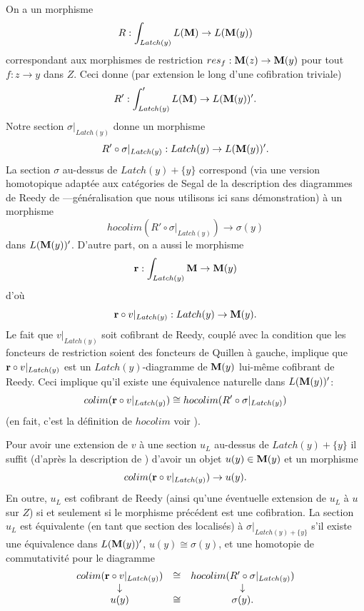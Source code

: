 \documentclass[12pt]{article}
\newcommand{\mm}{{\bf M}}
\begin{document}
On a un morphisme
$$
R: \int _{Latch(y)}L(\mm )\rightarrow L(\mm (y))
$$
correspondant aux
morphismes de restriction $res_f: \mm (z)\rightarrow \mm (y)$
pour tout $f:z\rightarrow y$ dans $Z$. Ceci donne
(par extension le long d'une cofibration triviale)
$$
R': \int '_{Latch(y)}L(\mm )\rightarrow L(\mm (y))' .
$$
Notre section $\sigma |_{Latch (y)}$ donne un morphisme
$$
R'\circ \sigma |_{Latch(y)} : Latch (y) \rightarrow L(\mm (y))'.
$$
La section $\sigma$ au-dessus de $Latch(y)+ \{ y\}$ correspond
(via une version homotopique
adapt\'ee aux cat\'egories de Segal de la description des
diagrammes de Reedy de \cite{Hirschhorn} \cite{DHK}---g\'en\'eralisation que
nous utilisons ici sans d\'emonstration) \`a un morphisme
$$
hocolim (R'\circ \sigma |_{Latch(y)})\rightarrow \sigma (y)
$$
dans $L(\mm (y))'$. D'autre part, on a aussi le morphisme
$$
{\bf r}: \int _{Latch(y)}\mm \rightarrow \mm (y)
$$
d'o\`u
$$
{\bf r}\circ v|_{Latch (y)}: Latch(y)\rightarrow \mm (y).
$$
Le fait que $v|_{Latch(y)}$ soit cofibrant de Reedy, coupl\'e avec la condition
que les foncteurs de restriction soient des foncteurs de Quillen \`a gauche,
implique que ${\bf r}\circ v|_{Latch (y)}$ est un $Latch(y)$-diagramme de
$\mm (y)$ lui-m\^eme cofibrant de Reedy. Ceci implique qu'il existe une
\'equivalence naturelle dans $L(\mm (y))'$:
$$
colim ({\bf r}\circ v|_{Latch (y)}) \cong
hocolim (R'\circ \sigma |_{Latch(y)})
$$
(en fait, c'est la d\'efinition de $hocolim$ voir \cite{BousfieldKan}
\cite{Hirschhorn} \cite{DHK}).

Pour avoir une extension de $v$ \`a une section $u_L$
au-dessus de $Latch (y)+ \{ y\}$ il suffit (d'apr\`es la description de
\cite{Hirschhorn} \cite{DHK}) d'avoir un objet $u(y)\in \mm (y)$ et un
morphisme
$$
colim ({\bf r}\circ v|_{Latch (y)})\rightarrow u(y).
$$
En outre, $u_L$ est cofibrant de Reedy (ainsi qu'une \'eventuelle extension
de $u_L$ \`a $u$ sur $Z$) si et seulement si le morphisme pr\'ec\'edent est une
cofibration. La section $u_L$ est  \'equivalente
(en tant que section des localis\'es)
\`a $\sigma |_{Latch(y)+ \{ y\}}$ s'il existe une \'equivalence dans
$L(\mm (y))'$, $u(y)\cong \sigma (y)$, et une homotopie de  commutativit\'e pour
le diagramme
$$
\begin{array}{ccc}
colim ({\bf r}\circ v|_{Latch (y)})
& \cong & hocolim (R'\circ \sigma |_{Latch(y)})\\
\downarrow && \downarrow \\
u(y) & \cong & \sigma (y).
\end{array}
$$
\end{document}
